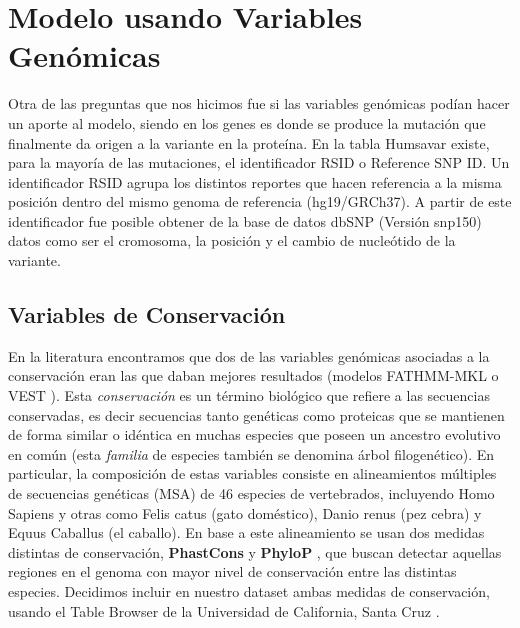 

\newpage

\section{Modelo usando Variables Genómicas}

Otra de las preguntas que nos hicimos fue si las variables genómicas podían hacer un aporte al modelo, siendo en los genes es donde se produce la mutación que finalmente da origen a la variante en la proteína. En la tabla Humsavar existe, para la mayoría de las mutaciones, el identificador RSID o Reference SNP ID. Un identificador RSID agrupa los distintos reportes que hacen referencia a la misma posición dentro del mismo genoma de referencia (hg19/GRCh37). A partir de este identificador fue posible obtener de la base de datos dbSNP (Versión snp150) datos como ser el cromosoma, la posición y el cambio de nucleótido de la variante. 


\subsection{Variables de Conservación}

En la literatura encontramos que dos de las variables genómicas asociadas a la conservación eran las que daban mejores resultados (modelos FATHMM-MKL \cite{Shihab2015} o VEST \cite{Carter2013}). Esta \textit{conservación} es un término biológico que refiere a las secuencias conservadas, es decir secuencias tanto genéticas como proteicas que se mantienen de forma similar o idéntica en muchas especies que poseen un ancestro evolutivo en común (esta \textit{familia} de especies también se denomina árbol filogenético). En particular, la composición de estas variables consiste en alineamientos múltiples de secuencias genéticas (MSA) de 46 especies de vertebrados, incluyendo Homo Sapiens y otras como Felis catus (gato doméstico), Danio renus (pez cebra) y Equus Caballus (el caballo). En base a este alineamiento se usan dos medidas distintas de conservación, \textbf{PhastCons} \cite{siepel2005evolutionarily} y \textbf{PhyloP} \cite{Pollard2010}, que buscan detectar aquellas regiones en el genoma con mayor nivel de conservación entre las distintas especies. Decidimos incluir en nuestro dataset ambas medidas de conservación, usando el Table Browser de la Universidad de California, Santa Cruz \cite{Karolchik2004}.

